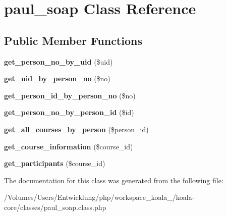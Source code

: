 \hypertarget{classpaul__soap}{
\section{paul\_\-soap Class Reference}
\label{classpaul__soap}
}
\subsection*{Public Member Functions}
\begin{DoxyCompactItemize}
\item 
\hypertarget{classpaul__soap_a456f5cac9c1f6b16b40473f04e4b7a67}{
{\bfseries get\_\-person\_\-no\_\-by\_\-uid} (\$uid)}
\label{classpaul__soap_a456f5cac9c1f6b16b40473f04e4b7a67}

\item 
\hypertarget{classpaul__soap_ab196cc549e1c8ade1e48778ed1371b53}{
{\bfseries get\_\-uid\_\-by\_\-person\_\-no} (\$no)}
\label{classpaul__soap_ab196cc549e1c8ade1e48778ed1371b53}

\item 
\hypertarget{classpaul__soap_a90049c54e7097a4f0f3ee628d2610376}{
{\bfseries get\_\-person\_\-id\_\-by\_\-person\_\-no} (\$no)}
\label{classpaul__soap_a90049c54e7097a4f0f3ee628d2610376}

\item 
\hypertarget{classpaul__soap_a7dabf4ef3e4b8f2aa3008d795f85a9cc}{
{\bfseries get\_\-person\_\-no\_\-by\_\-person\_\-id} (\$id)}
\label{classpaul__soap_a7dabf4ef3e4b8f2aa3008d795f85a9cc}

\item 
\hypertarget{classpaul__soap_a5b40b78268eed3dc8994e556f047aba5}{
{\bfseries get\_\-all\_\-courses\_\-by\_\-person} (\$person\_\-id)}
\label{classpaul__soap_a5b40b78268eed3dc8994e556f047aba5}

\item 
\hypertarget{classpaul__soap_a345777590d107f62c5a1bd4f43baba32}{
{\bfseries get\_\-course\_\-information} (\$course\_\-id)}
\label{classpaul__soap_a345777590d107f62c5a1bd4f43baba32}

\item 
\hypertarget{classpaul__soap_afc447808ae29af61521c95680d019539}{
{\bfseries get\_\-participants} (\$course\_\-id)}
\label{classpaul__soap_afc447808ae29af61521c95680d019539}

\end{DoxyCompactItemize}


The documentation for this class was generated from the following file:\begin{DoxyCompactItemize}
\item 
/Volumes/Users/Entwicklung/php/workspace\_\-koala\_/koala-\/core/classes/paul\_\-soap.class.php\end{DoxyCompactItemize}
